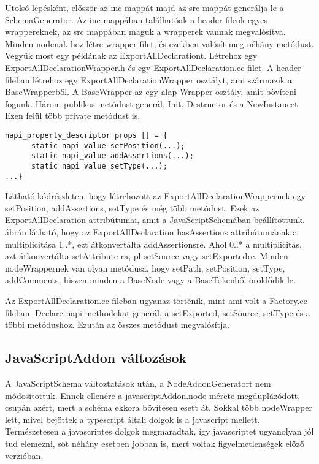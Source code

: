 Utolsó lépésként, először az inc mappát majd az src mappát generálja le a SchemaGenerator.
Az inc mappában találhatóak a header fileok egyes wrappereknek, az src mappában maguk a wrapperek vannak megvalósítva.
Minden nodenak hoz létre wrapper filet, és ezekben valósít meg néhány metódust.
Vegyük most egy példának az ExportAllDeclarationt. Létrehoz egy ExportAllDeclarationWrapper.h és egy ExportAllDeclaration.cc filet.
A header fileban létrehoz egy ExportAllDeclarationWrapper osztályt, ami származik a BaseWrapperből. A BaseWrapper az egy alap Wrapper osztály, amit bővíteni fogunk.
Három publikos metódust generál, Init, Destructor és a NewInstancet.
Ezen felül több private metódust is.
\begin{lstlisting}[caption={ExportAllDeclaration.h file}, label={lst:ExportAllDeclaration_header}, language={CStyle}]
napi_property_descriptor props [] = {
      static napi_value setPosition(...);
      static napi_value addAssertions(...);
      static napi_value setType(...);
...}
\end{lstlisting}

Látható  kódrészleten, hogy létrehozott az ExportAllDeclarationWrappernek egy setPosition, addAssertions, setType és még több metódust.
Ezek az ExportAllDeclaration attribútumai, amit a JavaScriptSchemában beállítottunk.
 ábrán látható, hogy az ExportAllDeclaration hasAssertions attribútumának a multiplicitása 1..*, ezt átkonvertálta addAssertionsre.
Ahol 0..* a multiplicitás, azt átkonvertálta setAttribute-ra, pl setSource vagy setExportedre.
Minden nodeWrappernek van olyan metódusa, hogy setPath, setPosition, setType, addComments, hiszen minden a BaseNode vagy a BaseTokenből öröklődik le.

\noindent

Az ExportAllDeclaration.cc fileban ugyanaz történik, mint ami volt a Factory.cc fileban. Declare napi methodokat generál, a setExported, setSource, setType és a többi metódushoz.
Ezután az összes metódust megvalósítja.

\subsection{JavaScriptAddon változások}

\noindent

A JavaScriptSchema változtatások után, a NodeAddonGeneratort nem módosítottuk.
Ennek ellenére a javascriptAddon.node mérete megduplázódott, csupán azért, mert a schéma ekkora bővítésen esett át.
Sokkal több nodeWrapper lett, mivel bejöttek a typescript általi dolgok is a javascript mellett.
Természetesen a javascriptes dolgok megmaradtak, így javascriptet ugyanolyan jól tud elemezni, sőt néhány esetben jobban is, mert voltak figyelmetlenségek előző verzióban.

